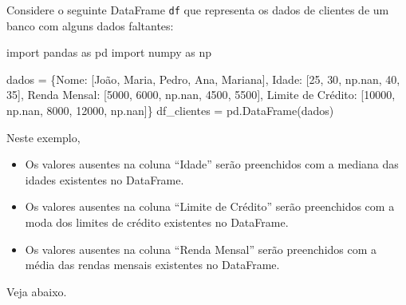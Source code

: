 \documentclass[
  portuguese,
  letterpaper,
  DIV=11,
  numbers=noendperiod]{scrreprt}
\newenvironment{Shaded}{\begin{snugshade}}{\end{snugshade}}
\newcommand{\DecValTok}[1]{\textcolor[rgb]{0.68,0.00,0.00}{#1}}
\newcommand{\ImportTok}[1]{\textcolor[rgb]{0.00,0.46,0.62}{#1}}
\newcommand{\NormalTok}[1]{\textcolor[rgb]{0.00,0.23,0.31}{#1}}
\newcommand{\OperatorTok}[1]{\textcolor[rgb]{0.37,0.37,0.37}{#1}}
\newcommand{\StringTok}[1]{\textcolor[rgb]{0.13,0.47,0.30}{#1}}
\providecommand{\tightlist}{%
  \setlength{\itemsep}{0pt}\setlength{\parskip}{0pt}}
\theoremstyle{definition}
\theoremstyle{remark}
\begin{document}
Considere o seguinte DataFrame \texttt{df} que representa os dados de
clientes de um banco com alguns dados faltantes:

\begin{Shaded}
\begin{Highlighting}[]
\ImportTok{import}\NormalTok{ pandas }\ImportTok{as}\NormalTok{ pd}
\ImportTok{import}\NormalTok{ numpy }\ImportTok{as}\NormalTok{ np}

\NormalTok{dados }\OperatorTok{=}\NormalTok{ \{}\StringTok{\textquotesingle{}Nome\textquotesingle{}}\NormalTok{: [}\StringTok{\textquotesingle{}João\textquotesingle{}}\NormalTok{, }\StringTok{\textquotesingle{}Maria\textquotesingle{}}\NormalTok{, }\StringTok{\textquotesingle{}Pedro\textquotesingle{}}\NormalTok{, }\StringTok{\textquotesingle{}Ana\textquotesingle{}}\NormalTok{, }\StringTok{\textquotesingle{}Mariana\textquotesingle{}}\NormalTok{],}
        \StringTok{\textquotesingle{}Idade\textquotesingle{}}\NormalTok{: [}\DecValTok{25}\NormalTok{, }\DecValTok{30}\NormalTok{, np.nan, }\DecValTok{40}\NormalTok{, }\DecValTok{35}\NormalTok{],}
        \StringTok{\textquotesingle{}Renda Mensal\textquotesingle{}}\NormalTok{: [}\DecValTok{5000}\NormalTok{, }\DecValTok{6000}\NormalTok{, np.nan, }\DecValTok{4500}\NormalTok{, }\DecValTok{5500}\NormalTok{],}
        \StringTok{\textquotesingle{}Limite de Crédito\textquotesingle{}}\NormalTok{: [}\DecValTok{10000}\NormalTok{, np.nan, }\DecValTok{8000}\NormalTok{, }\DecValTok{12000}\NormalTok{, np.nan]\}}
\NormalTok{df\_clientes }\OperatorTok{=}\NormalTok{ pd.DataFrame(dados)}
\end{Highlighting}
\end{Shaded}

Neste exemplo,

\begin{itemize}
\tightlist
\item
  Os valores ausentes na coluna ``Idade'' serão preenchidos com a
  mediana das idades existentes no DataFrame.
\item
  Os valores ausentes na coluna ``Limite de Crédito'' serão preenchidos
  com a moda dos limites de crédito existentes no DataFrame.
\item
  Os valores ausentes na coluna ``Renda Mensal'' serão preenchidos com a
  média das rendas mensais existentes no DataFrame.
\end{itemize}

Veja abaixo.
\end{document}
